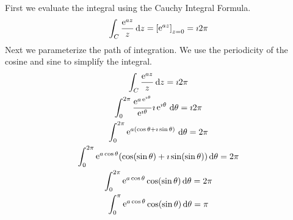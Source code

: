 {\begin{Solution}
  First we evaluate the integral using the Cauchy Integral Formula.
  \[
  \int_C \frac{\mathop{\mathrm{e}}\nolimits^{a z}}{z} \,\mathrm{d} z = \left[ \mathop{\mathrm{e}}\nolimits^{a z} \right]_{z = 0} = \imath 2 \pi
  \]
  Next we parameterize the path of integration.  We use the periodicity
  of the cosine and sine to simplify the integral.
  \begin{gather*}
    \int_C \frac{\mathop{\mathrm{e}}\nolimits^{a z}}{z} \,\mathrm{d} z = \imath 2 \pi
    \\
    \int_0^{2 \pi} \frac{\mathop{\mathrm{e}}\nolimits^{a \mathop{\mathrm{e}}\nolimits^{\imath \theta}}}{\mathop{\mathrm{e}}\nolimits^{\imath \theta}} \imath \mathop{\mathrm{e}}\nolimits^{\imath \theta}\,\mathrm{d} \theta = \imath 2 \pi
    \\
    \int_0^{2 \pi} \mathop{\mathrm{e}}\nolimits^{a (\cos \theta + \imath \sin \theta)}\,\mathrm{d} \theta = 2 \pi
    \\
    \int_0^{2 \pi} \mathop{\mathrm{e}}\nolimits^{a \cos \theta} (\cos(\sin \theta) + \imath \sin(\sin \theta))\,\mathrm{d} \theta = 2 \pi
    \\
    \int_0^{2 \pi} \mathop{\mathrm{e}}\nolimits^{a \cos \theta} \cos(\sin \theta)\,\mathrm{d} \theta = 2 \pi
    \\
    \int_0^\pi \mathop{\mathrm{e}}\nolimits^{a \cos \theta} \cos(\sin \theta)\,\mathrm{d} \theta = \pi
  \end{gather*}
\end{Solution}








}
